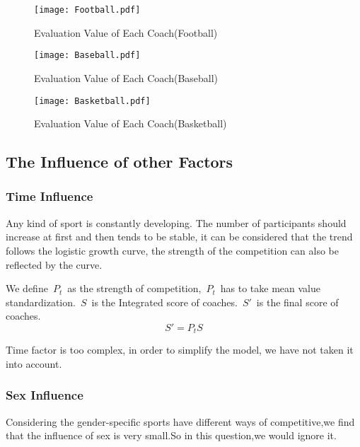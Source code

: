 \documentclass{mcmthesis}
\begin{document}
\begin{figure} [h]
\centering
\texttt{[image: Football.pdf]}
\caption{ Evaluation Value of Each Coach(Football)}
\label{fig:graph}
\end{figure}

\begin{figure} [h]
\centering
\texttt{[image: Baseball.pdf]}
\caption{Evaluation Value of Each Coach(Baseball)}
\label{fig:graph}
\end{figure}

\begin{figure} [h]
\centering
\texttt{[image: Basketball.pdf]}
\caption{Evaluation Value of Each Coach(Basketball)}
\label{fig:graph}
\end{figure}

\subsection{The Influence  of other Factors}
\subsubsection{Time Influence}
\par Any kind of sport is constantly developing. The number of participants should  increase at first and then tends to be stable, it can be considered that the trend follows the logistic growth curve, the strength of the competition can also be reflected by the curve.
\par We define~${P}_{t}$~as the strength of competition,~${P}_{t}$~has to take mean value standardization.~$S$~is the Integrated score of coaches.~$S'$~is the final score of coaches.
\begin{equation}
S'={P}_{t}S
\end{equation}
\par Time factor is too complex, in order to simplify the model, we have not taken it into account.
\subsubsection{ Sex Influence}
\par Considering the gender-specific sports have different ways of competitive,we find that the influence of sex is very small.So in this question,we would ignore it.
\end{document}
